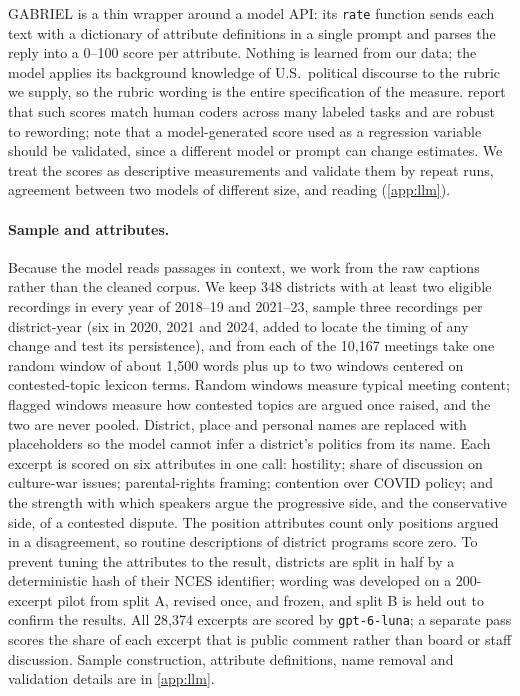 \documentclass[12pt]{article}
\begin{document}
GABRIEL \citep{gabriel} is a thin wrapper around a model API: its \texttt{rate} function sends each text with a dictionary of attribute definitions in a single prompt and parses the reply into a 0--100 score per attribute. Nothing is learned from our data; the model applies its background knowledge of U.S.\ political discourse to the rubric we supply, so the rubric wording is the entire specification of the measure. \citet{asirvatham_gpt_2026} report that such scores match human coders across many labeled tasks and are robust to rewording; \citet{ludwig_llm_2025} note that a model-generated score used as a regression variable should be validated, since a different model or prompt can change estimates. We treat the scores as descriptive measurements and validate them by repeat runs, agreement between two models of different size, and reading (\cref{app:llm}).

\paragraph{Sample and attributes.}
Because the model reads passages in context, we work from the raw captions rather than the cleaned corpus. We keep 348 districts with at least two eligible recordings in every year of 2018--19 and 2021--23, sample three recordings per district-year (six in 2020, 2021 and 2024, added to locate the timing of any change and test its persistence), and from each of the 10,167 meetings take one random window of about 1,500 words plus up to two windows centered on contested-topic lexicon terms. Random windows measure typical meeting content; flagged windows measure how contested topics are argued once raised, and the two are never pooled. District, place and personal names are replaced with placeholders so the model cannot infer a district's politics from its name. Each excerpt is scored on six attributes in one call: hostility; share of discussion on culture-war issues; parental-rights framing; contention over COVID policy; and the strength with which speakers argue the progressive side, and the conservative side, of a contested dispute. The position attributes count only positions argued in a disagreement, so routine descriptions of district programs score zero. To prevent tuning the attributes to the result, districts are split in half by a deterministic hash of their NCES identifier; wording was developed on a 200-excerpt pilot from split A, revised once, and frozen, and split B is held out to confirm the results. All 28,374 excerpts are scored by \texttt{gpt-6-luna}; a separate pass scores the share of each excerpt that is public comment rather than board or staff discussion. Sample construction, attribute definitions, name removal and validation details are in \cref{app:llm}.
\end{document}
